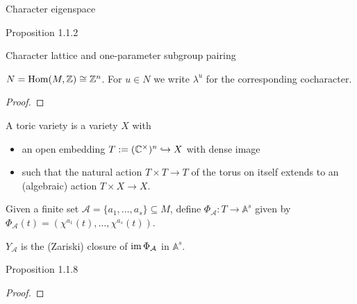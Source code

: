 \begin{definition}
  \label{char_eigenspace}
  Character eigenspace
\end{definition}

\begin{proposition}
  \label{prop:1.1.2}
  Proposition 1.1.2
\end{proposition}

\begin{definition}
  \label{char_ops_pairing}
  Character lattice and one-parameter subgroup pairing
\end{definition}

\begin{proposition}
  $N = \operatorname{Hom}(M, {\mathbb Z}) \cong  {\mathbb Z}^n$. For $u \in N$ we write $\lambda^u$ for the corresponding cocharacter.
\end{proposition}
\begin{proof}
\end{proof}

\begin{definition}
  \label{ToricVariety}
  \leanok
  A toric variety is a variety $X$ with
  \begin{itemize}
    \item an open embedding $T := ({\mathbb C}^\times)^n \hookrightarrow X$ with dense image
    \item such that the natural action $T \times T \to T$ of the torus on itself extends to an (algebraic) action $T \times X \to X$.
  \end{itemize}
\end{definition}

\begin{definition}
  \label{phiA}
  Given a finite set $\mathcal A = \{a_1, \dotsc, a_s\} \subseteq M$, define $\Phi_{\mathcal{A}} : T \to \mathbb A^s$ given by $\Phi_{\mathcal A} (t) = (\chi^{a_1} (t), \dotsc, \chi^{a_s} (t))$.
\end{definition}

\begin{definition}
  \label{YA}
  $Y_{\mathcal{A}}$ is the (Zariski) closure of $\operatorname{im} \Phi_{\mathcal A}$ in $\mathbb A^s$.
\end{definition}

\begin{proposition}
  \label{prop:1.1.8}
  Proposition 1.1.8
\end{proposition}
\begin{proof}
\end{proof}

